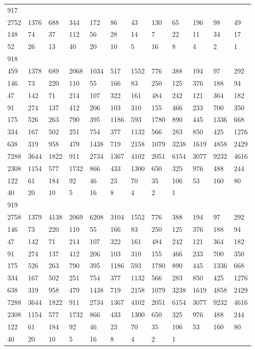 \begin{longtable}{llllllllllll}
917&&&&&&&&&&&\\
2752& 1376& 688& 344& 172& 86& 43& 130& 65& 196& 98& 49\\
148& 74& 37& 112& 56& 28& 14& 7& 22& 11& 34& 17\\
52& 26& 13& 40& 20& 10& 5& 16& 8& 4& 2& 1\\

918&&&&&&&&&&&\\
459& 1378& 689& 2068& 1034& 517& 1552& 776& 388& 194& 97& 292\\
146& 73& 220& 110& 55& 166& 83& 250& 125& 376& 188& 94\\
47& 142& 71& 214& 107& 322& 161& 484& 242& 121& 364& 182\\
91& 274& 137& 412& 206& 103& 310& 155& 466& 233& 700& 350\\
175& 526& 263& 790& 395& 1186& 593& 1780& 890& 445& 1336& 668\\
334& 167& 502& 251& 754& 377& 1132& 566& 283& 850& 425& 1276\\
638& 319& 958& 479& 1438& 719& 2158& 1079& 3238& 1619& 4858& 2429\\
7288& 3644& 1822& 911& 2734& 1367& 4102& 2051& 6154& 3077& 9232& 4616\\
2308& 1154& 577& 1732& 866& 433& 1300& 650& 325& 976& 488& 244\\
122& 61& 184& 92& 46& 23& 70& 35& 106& 53& 160& 80\\
40& 20& 10& 5& 16& 8& 4& 2& 1& \\

919&&&&&&&&&&&\\
2758& 1379& 4138& 2069& 6208& 3104& 1552& 776& 388& 194& 97& 292\\
146& 73& 220& 110& 55& 166& 83& 250& 125& 376& 188& 94\\
47& 142& 71& 214& 107& 322& 161& 484& 242& 121& 364& 182\\
91& 274& 137& 412& 206& 103& 310& 155& 466& 233& 700& 350\\
175& 526& 263& 790& 395& 1186& 593& 1780& 890& 445& 1336& 668\\
334& 167& 502& 251& 754& 377& 1132& 566& 283& 850& 425& 1276\\
638& 319& 958& 479& 1438& 719& 2158& 1079& 3238& 1619& 4858& 2429\\
7288& 3644& 1822& 911& 2734& 1367& 4102& 2051& 6154& 3077& 9232& 4616\\
2308& 1154& 577& 1732& 866& 433& 1300& 650& 325& 976& 488& 244\\
122& 61& 184& 92& 46& 23& 70& 35& 106& 53& 160& 80\\
40& 20& 10& 5& 16& 8& 4& 2& 1& \\


\end{longtable}
